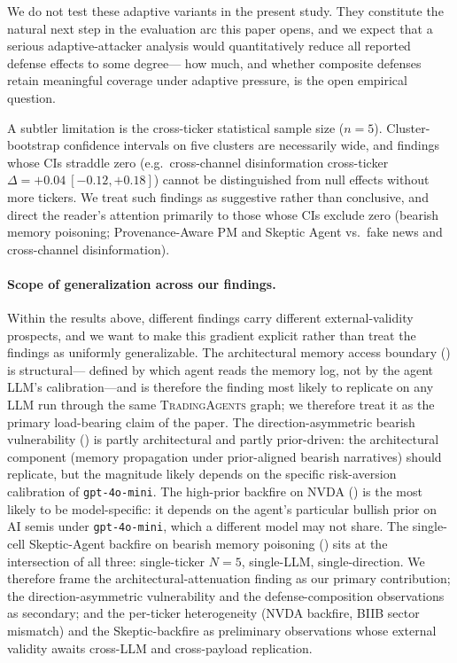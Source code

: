 \documentclass[10pt,letterpaper]{article}
\newcommand{\TA}{\textsc{TradingAgents}}
\begin{document}
We do not test these adaptive variants in the present study. They
constitute the natural next step in the evaluation arc this paper
opens, and we expect that a serious adaptive-attacker analysis would
quantitatively reduce all reported defense effects to some degree---
how much, and whether composite defenses retain meaningful coverage
under adaptive pressure, is the open empirical question.

A subtler limitation is the cross-ticker statistical sample size
($n=5$). Cluster-bootstrap confidence intervals on five clusters are
necessarily wide, and findings whose CIs straddle zero
(e.g.\ cross-channel disinformation cross-ticker $\Delta=+0.04~[-0.12,+0.18]$) cannot be
distinguished from null effects without more tickers. We treat such
findings as suggestive rather than conclusive, and direct the
reader's attention primarily to those whose CIs exclude zero
(bearish memory poisoning; Provenance-Aware PM and Skeptic Agent vs.\ fake news and cross-channel disinformation).

\paragraph{Scope of generalization across our findings.} Within the
results above, different findings carry different external-validity
prospects, and we want to make this gradient explicit rather than
treat the findings as uniformly generalizable. The architectural
memory access boundary () is structural---
defined by which agent reads the memory log, not by the agent LLM's
calibration---and is therefore the finding most likely to replicate
on any LLM run through the same \TA{} graph; we therefore treat it
as the primary load-bearing claim of the paper. The
direction-asymmetric bearish vulnerability
() is partly architectural and partly
prior-driven: the architectural component (memory propagation under
prior-aligned bearish narratives) should replicate, but the magnitude
likely depends on the specific risk-aversion calibration of
\texttt{gpt-4o-mini}. The high-prior backfire on NVDA
() is the most likely to be model-specific:
it depends on the agent's particular bullish prior on AI semis under
\texttt{gpt-4o-mini}, which a different model may not share. The
single-cell Skeptic-Agent backfire on bearish memory poisoning
() sits at the intersection of all three:
single-ticker $N\!=\!5$, single-LLM, single-direction. We therefore
frame the architectural-attenuation finding as our primary
contribution; the direction-asymmetric vulnerability and the
defense-composition observations as secondary; and the per-ticker
heterogeneity (NVDA backfire, BIIB sector mismatch) and the
Skeptic-backfire as preliminary observations whose external
validity awaits cross-LLM and cross-payload replication.
\end{document}
